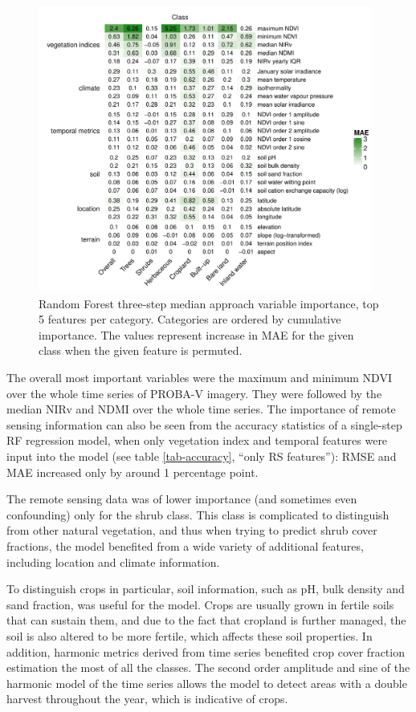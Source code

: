 \documentclass[review,authoryear,3p]{elsarticle}
\begin{document}
\begin{figure}
    \centering
    \includegraphics[width=11cm]{article-figures/heatmaps/2020-11-06-varimp-heatmap-top5}
    \caption{Random Forest three-step median approach variable importance, top 5 features per category. Categories are ordered by cumulative importance. The values represent increase in MAE for the given class when the given feature is permuted.}
    \label{fig-varimp}
\end{figure}

The overall most important variables were the maximum and minimum \gls{NDVI} over the whole time series of PROBA-V imagery.
They were followed by the median \gls{NIRv} and \gls{NDMI} over the whole time series.
The importance of remote sensing information can also be seen from the accuracy statistics of a single-step \gls{RF} regression model, when only vegetation index and temporal features were input into the model (see table \ref{tab-accuracy}, ``only RS features''):
\gls{RMSE} and \gls{MAE} increased only by around 1 percentage point.

The remote sensing data was of lower importance (and sometimes even confounding) only for the shrub class.
This class is complicated to distinguish from other natural vegetation, and thus when trying to predict shrub cover fractions, the model benefited from a wide variety of additional features, including location and climate information.

To distinguish crops in particular, soil information, such as pH, bulk density and sand fraction, was useful for the model.
Crops are usually grown in fertile soils that can sustain them, and due to the fact that cropland is further managed, the soil is also altered to be more fertile, which affects these soil properties.
In addition, harmonic metrics derived from time series benefited crop cover fraction estimation the most of all the classes.
The second order amplitude and sine of the harmonic model of the time series allows the model to detect areas with a double harvest throughout the year, which is indicative of crops.
\end{document}
